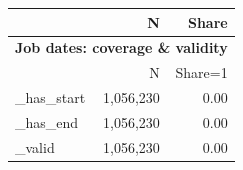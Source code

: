 \begin{tabular}{lrr}


\toprule


 & N & Share \\


\midrule


\multicolumn{3}{l}{\textbf{Job dates: coverage \& validity}}\\ 
                    &           N&     Share=1\\
\midrule
\_has\_start          &   1,056,230&        0.00\\
\_has\_end            &   1,056,230&        0.00\\
\_valid              &   1,056,230&        0.00\\
\bottomrule


\end{tabular}


